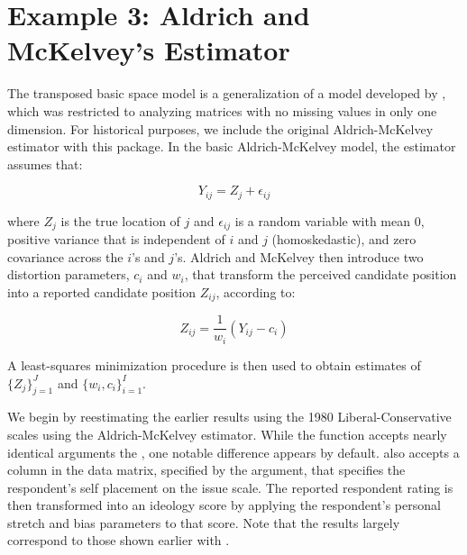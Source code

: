 \documentclass[nojss]{jss}
\begin{document}
\section{Example 3: Aldrich and McKelvey's Estimator}

The transposed basic space model is a generalization of a model developed by \citet{aldrich1977method}, which was restricted to analyzing matrices with no missing values in only one dimension.  For historical purposes, we include the original Aldrich-McKelvey estimator with this package. In the basic Aldrich-McKelvey model, the estimator assumes that:

$$Y_{ij} = Z_j + \epsilon_{ij}$$

\noindent where $Z_j$ is the true location of $j$ and $\epsilon_{ij}$ is a random variable with mean 0, positive variance that is independent of $i$ and $j$ (homoskedastic), and zero covariance across the $i$'s and $j$'s. Aldrich and McKelvey then introduce two distortion parameters, $c_i$ and $w_i$, that transform the perceived candidate position into a reported candidate position $Z_{ij}$, according to:

$$Z_{ij}= \frac{1}{w_i}(Y_{ij} - c_i)$$

A least-squares minimization procedure is then used to obtain estimates of $\{Z_j\}_{j=1}^{J}$ and $\{w_i,c_i\}_{i=1}^{I}$.

We begin by reestimating the earlier results using the 1980 Liberal-Conservative scales using the Aldrich-McKelvey estimator. While the  function accepts nearly identical arguments the , one notable difference appears by default.   also accepts a column in the data matrix, specified by the  argument, that specifies the respondent's self placement on the issue scale. The reported respondent rating is then transformed into an ideology score by applying the respondent's personal stretch and bias parameters to that score. Note that the results largely correspond to those shown earlier with .
\end{document}
